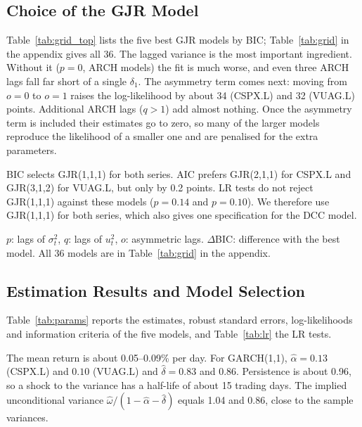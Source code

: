 \documentclass[10pt,a4paper]{article}
\begin{document}
\subsection{Choice of the GJR Model}
Table~\ref{tab:grid_top} lists the five best GJR models by BIC; Table~\ref{tab:grid} in the appendix gives
all 36. The lagged variance is
the most important ingredient. Without it ($p=0$, ARCH models) the fit is much worse, and even three
ARCH lags fall far short of a single $\delta_1$. The asymmetry term comes next: moving from $o=0$ to
$o=1$ raises the log-likelihood by about 34 (CSPX.L) and 32 (VUAG.L) points. Additional ARCH lags
($q>1$) add almost nothing. Once the asymmetry term is included their estimates go to zero, so many of
the larger models reproduce the likelihood of a smaller one and are penalised for the extra parameters.

BIC selects GJR(1,1,1) for both series. AIC prefers GJR(2,1,1) for CSPX.L and GJR(3,1,2) for VUAG.L, but
only by 0.2 points. LR tests do not reject GJR(1,1,1) against these models ($p=0.14$ and $p=0.10$). We
therefore use GJR(1,1,1) for both series, which also gives one specification for the DCC model.

\begin{table}[htbp]
\centering
\caption{The five best GJR$(p,q,o)$ models by BIC, and GARCH(1,1)}\label{tab:grid_top}
\footnotesize
\setlength{\tabcolsep}{4pt}

\par\smallskip
\begin{minipage}{0.95\textwidth}\footnotesize
$p$: lags of $\sigma^2_t$, $q$: lags of $u_t^2$, $o$: asymmetric lags. $\Delta$BIC: difference with the
best model. All 36 models are in Table~\ref{tab:grid} in the appendix.
\end{minipage}
\end{table}

\subsection{Estimation Results and Model Selection}
Table~\ref{tab:params} reports the estimates, robust standard errors, log-likelihoods and information
criteria of the five models, and Table~\ref{tab:lr} the LR tests.

The mean return is about 0.05--0.09\% per day. For GARCH(1,1), $\hat\alpha=0.13$ (CSPX.L) and $0.10$
(VUAG.L) and $\hat\delta=0.83$ and $0.86$. Persistence is about 0.96, so a shock to the variance has a
half-life of about 15 trading days. The implied unconditional variance
$\hat\omega/(1-\hat\alpha-\hat\delta)$ equals 1.04 and 0.86, close to the sample variances.
\end{document}
